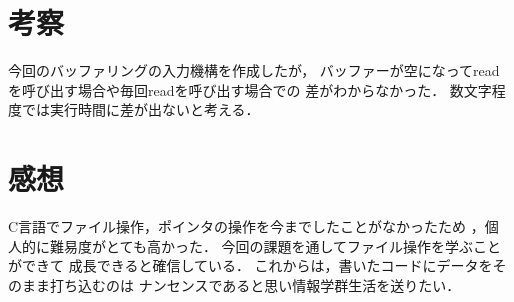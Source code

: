 \documentclass{jlreq}
\begin{document}
\section{考察}
今回のバッファリングの入力機構を作成したが，
バッファーが空になってreadを呼び出す場合や毎回readを呼び出す場合での
差がわからなかった．
数文字程度では実行時間に差が出ないと考える．
\section{感想}
C言語でファイル操作，ポインタの操作を今までしたことがなかったため
，個人的に難易度がとても高かった．
今回の課題を通してファイル操作を学ぶことができて
成長できると確信している．
これからは，書いたコードにデータをそのまま打ち込むのは
ナンセンスであると思い情報学群生活を送りたい．
\end{document}
